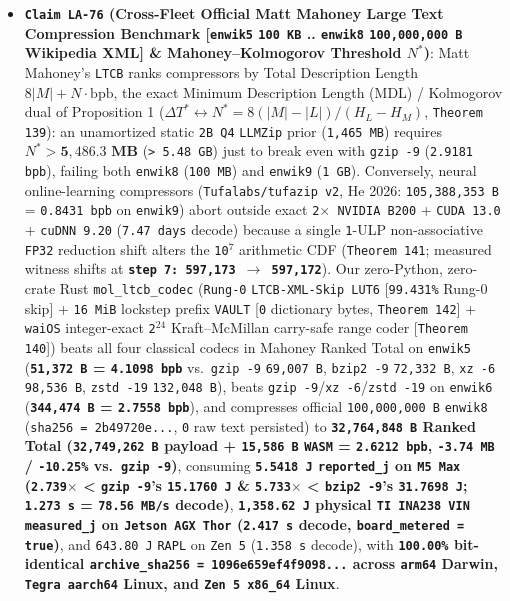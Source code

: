 \documentclass[10pt]{article}
\begin{document}
\begin{itemize}
  \item \textbf{\texttt{Claim LA-76} (Cross-Fleet Official Matt Mahoney Large Text Compression Benchmark [\texttt{enwik5} \texttt{100 KB} .. \texttt{enwik8} \texttt{100,000,000 B} Wikipedia XML] \& Mahoney--Kolmogorov Threshold $N^*$)}: Matt Mahoney's \texttt{LTCB} ranks compressors by Total Description Length $8|M| + N \cdot \mathrm{bpb}$, the exact Minimum Description Length (MDL) / Kolmogorov dual of Proposition 1 ($\Delta T^* \leftrightarrow N^* = 8(|M|-|L|)/(H_L - H_M)$, \texttt{Theorem 139}): an unamortized static \texttt{2B Q4} \texttt{LLMZip} prior (\texttt{1,465 MB}) requires $N^* > \mathbf{5{,}486.3\text{ MB}}$ (\texttt{> 5.48 GB}) just to break even with \texttt{gzip -9} (\texttt{2.9181 bpb}), failing both \texttt{enwik8} (\texttt{100 MB}) and \texttt{enwik9} (\texttt{1 GB}). Conversely, neural online-learning compressors (\texttt{Tufalabs/tufazip v2}, He 2026: \texttt{105,388,353 B} = \texttt{0.8431 bpb} on \texttt{enwik9}) abort outside exact \texttt{2$\times$ NVIDIA B200} + \texttt{CUDA 13.0} + \texttt{cuDNN 9.20} (\texttt{7.47 days} decode) because a single \texttt{1}-ULP non-associative \texttt{FP32} reduction shift alters the \texttt{10$^7$} arithmetic CDF (\texttt{Theorem 141}; measured witness shifts at \textbf{\texttt{step 7: 597,173 $\to$ 597,172}}). Our zero-Python, zero-crate Rust \texttt{mol\_ltcb\_codec} (\texttt{Rung-0} \texttt{LTCB-XML-Skip LUT6} [\texttt{99.431\%} Rung-0 skip] + \texttt{16 MiB} lockstep prefix \texttt{VAULT} [\texttt{0} dictionary bytes, \texttt{Theorem 142}] + \texttt{waiOS} integer-exact \texttt{2$^{24}$} Kraft--McMillan carry-safe range coder [\texttt{Theorem 140}]) beats all four classical codecs in Mahoney Ranked Total on \texttt{enwik5} (\textbf{\texttt{51,372 B} = \texttt{4.1098 bpb}} vs.\ \texttt{gzip -9} \texttt{69,007 B}, \texttt{bzip2 -9} \texttt{72,332 B}, \texttt{xz -6} \texttt{98,536 B}, \texttt{zstd -19} \texttt{132,048 B}), beats \texttt{gzip -9}/\texttt{xz -6}/\texttt{zstd -19} on \texttt{enwik6} (\textbf{\texttt{344,474 B} = \texttt{2.7558 bpb}}), and compresses official \texttt{100,000,000 B} \texttt{enwik8} (\texttt{sha256 = 2b49720e...}, \texttt{0} raw text persisted) to \textbf{\texttt{32,764,848 B} Ranked Total (\texttt{32,749,262 B} payload + \texttt{15,586 B} \texttt{WASM} = \texttt{2.6212 bpb}, \texttt{-3.74 MB} / \texttt{-10.25\%} vs.\ \texttt{gzip -9})}, consuming \textbf{\texttt{5.5418 J} \texttt{reported\_j} on \texttt{M5 Max} (\texttt{2.739$\times$} < \texttt{gzip -9}'s \texttt{15.1760 J} \& \texttt{5.733$\times$} < \texttt{bzip2 -9}'s \texttt{31.7698 J}; \texttt{1.273 s} = \texttt{78.56 MB/s} decode)}, \textbf{\texttt{1,358.62 J} physical \texttt{TI INA238 VIN} \texttt{measured\_j} on \texttt{Jetson AGX Thor} (\texttt{2.417 s} decode, \texttt{board\_metered = true})}, and \texttt{643.80 J} \texttt{RAPL} on \texttt{Zen 5} (\texttt{1.358 s} decode), with \textbf{\texttt{100.00\%} bit-identical \texttt{archive\_sha256 = 1096e659ef4f9098...} across \texttt{arm64} Darwin, \texttt{Tegra aarch64} Linux, and \texttt{Zen 5 x86\_64} Linux}.

\end{itemize}
\end{document}

